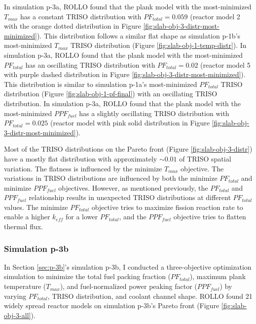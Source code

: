 In simulation p-3a, \gls{ROLLO} found that the plank model with the most-minimized 
$T_{max}$ has a constant TRISO distribution with $PF_{total} = 0.059$
(reactor model 2 with the orange dotted distribution in Figure 
\ref{fig:slab-obj-3-distr-most-minimized}). 
This distribution follows a similar flat shape as simulation p-1b's most-minimized 
$T_{max}$ TRISO distribution (Figure \ref{fig:slab-obj-1-temp-distr}).
In simulation p-3a, \gls{ROLLO} found that the plank model with the most-minimized 
$PF_{total}$ has an oscillating TRISO distribution with $PF_{total} = 0.02$
(reactor model 5 with purple dashed distribution in Figure 
\ref{fig:slab-obj-3-distr-most-minimized}). 
This distribution is similar to simulation p-1a's most-minimized $PF_{total}$ TRISO 
distribution (Figure \ref{fig:slab-obj-1-pf-final}) with an oscillating TRISO 
distribution.
In simulation p-3a, \gls{ROLLO} found that the plank model with the most-minimized 
$PPF_{fuel}$ has a slightly oscillating TRISO distribution with $PF_{total} = 0.025$ 
(reactor model with pink solid distribution in Figure 
\ref{fig:slab-obj-3-distr-most-minimized}). 

Most of the \gls{TRISO} distributions on the Pareto front (Figure 
\ref{fig:slab-obj-3-distr}) have a mostly flat distribution with approximately 
${\sim}0.01$ of TRISO spatial variation. 
The flatness is influenced by the minimize $T_{max}$ objective. 
The variations in \gls{TRISO} distributions are influenced by both the minimize 
$PF_{total}$ and minimize $PPF_{fuel}$ objectives. 
However, as mentioned previously, the $PF_{total}$ and $PPF_{fuel}$ relationship
results in unexpected TRISO distributions at different $PF_{total}$ values. 
The minimize $PF_{total}$ objective tries to maximize fission reaction rate
to enable a higher $k_{eff}$ for a lower $PF_{total}$, and 
the $PPF_{fuel}$ objective tries to flatten thermal flux. 

\subsubsection{Simulation p-3b}
In Section \ref{sec:p-3b}'s simulation p-3b, I conducted a three-objective 
optimization simulation to minimize the total fuel packing fraction ($PF_{total}$), 
maximum plank temperature ($T_{max}$), and fuel-normalized power peaking factor 
($PPF_{fuel}$) by varying $PF_{total}$, TRISO distribution, and coolant channel shape.
\gls{ROLLO} found 21 widely spread reactor models on simulation p-3b's Pareto 
front (Figure \ref{fig:slab-obj-3-all}). 

